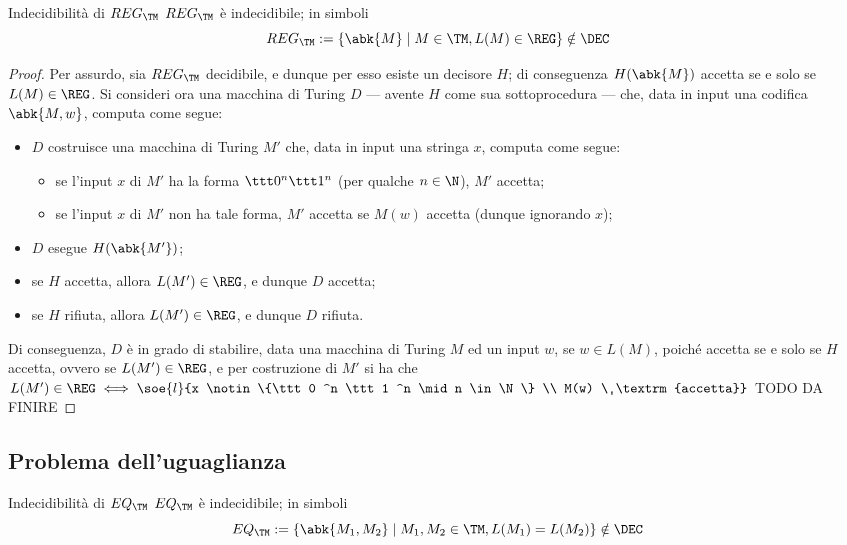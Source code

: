 \documentclass[a4paper, 12pt]{report}
\begin{document}
    \begin{framedthm}{Indecidibilità di $REG_\TM$}
        $REG_\TM$ è indecidibile; in simboli $$REG_\TM := \{\abk{M} \mid M \in \TM , L(M) \in \REG\} \notin \DEC$$
    \end{framedthm}

    \begin{proof}
        Per assurdo, sia $REG_\TM$ decidibile, e dunque per esso esiste un decisore $H$; di conseguenza $H(\abk{M})$ accetta se e solo se $L(M) \in \REG$. Si consideri ora una macchina di Turing $D$ --- avente $H$ come sua sottoprocedura --- che, data in input una codifica $\abk{M, w}$, computa come segue:

        \begin{itemize}
            \item $D$ costruisce una macchina di Turing $M'$ che, data in input una stringa $x$, computa come segue:
                \begin{itemize}
                    \item se l'input $x$ di $M'$ ha la forma $\ttt 0^n \ttt 1 ^n$ (per qualche $n \in \N$), $M'$ accetta;
                    \item se l'input $x$ di $M'$ non ha tale forma, $M'$ accetta se $M(w)$ accetta (dunque ignorando $x$);
                \end{itemize}
            \item $D$ esegue $H(\abk{M'})$;
            \item se $H$ accetta, allora $L(M') \in \REG$, e dunque $D$ accetta;
            \item se $H$ rifiuta, allora $L(M') \in \REG$, e dunque $D$ rifiuta.
        \end{itemize}

        Di conseguenza, $D$ è in grado di stabilire, data una macchina di Turing $M$ ed un input $w$, se $w \in L(M)$, poiché accetta se e solo se $H$ accetta, ovvero se $L(M') \in \REG$, e per costruzione di $M'$ si ha che $L(M') \in \REG \iff \soe{l}{x \notin \{\ttt 0 ^n \ttt 1 ^n \mid n \in \N\} \\ M(w) \ \textrm{accetta}}$ TODO DA FINIRE
    \end{proof}

    \subsection{Problema dell'uguaglianza}

    \begin{framedthm}{Indecidibilità di $EQ_\TM$}
        $EQ_\TM$ è indecidibile; in simboli $$EQ_\TM := \{\abk{M_1, M_2} \mid M_1, M_2 \in \TM, L(M_1) = L(M_2)\} \notin \DEC$$
    \end{framedthm}
\end{document}
